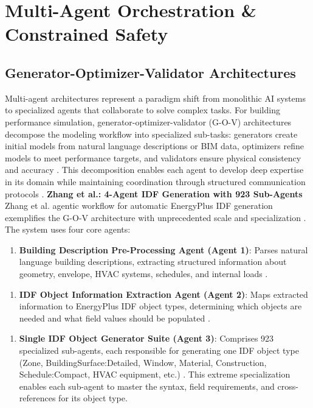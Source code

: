 \documentclass[12pt,a4paper]{article}
\begin{document}
\section{Multi-Agent Orchestration \& Constrained Safety}
\subsection{Generator-Optimizer-Validator Architectures}
Multi-agent architectures represent a paradigm shift from monolithic AI systems to specialized agents that collaborate to solve complex tasks. For building performance simulation, generator-optimizer-validator (G-O-V) architectures decompose the modeling workflow into specialized sub-tasks: generators create initial models from natural language descriptions or BIM data, optimizers refine models to meet performance targets, and validators ensure physical consistency and accuracy \cite{ref123}. This decomposition enables each agent to develop deep expertise in its domain while maintaining coordination through structured communication protocols \cite{ref125}.
\textbf{Zhang et al.: 4-Agent IDF Generation with 923 Sub-Agents}
Zhang et al. agentic workflow for automatic EnergyPlus IDF generation exemplifies the G-O-V architecture with unprecedented scale and specialization \cite{ref123}. The system uses four core agents:
\begin{enumerate}
  \item \textbf{Building Description Pre-Processing Agent (Agent 1)}: Parses natural language building descriptions, extracting structured information about geometry, envelope, HVAC systems, schedules, and internal loads \cite{ref123}.
\end{enumerate}
\begin{enumerate}[resume]
  \item \textbf{IDF Object Information Extraction Agent (Agent 2)}: Maps extracted information to EnergyPlus IDF object types, determining which objects are needed and what field values should be populated \cite{ref123}.
\end{enumerate}
\begin{enumerate}[resume]
  \item \textbf{Single IDF Object Generator Suite (Agent 3)}: Comprises 923 specialized sub-agents, each responsible for generating one IDF object type (Zone, BuildingSurface:Detailed, Window, Material, Construction, Schedule:Compact, HVAC equipment, etc.) \cite{ref123}. This extreme specialization enables each sub-agent to master the syntax, field requirements, and cross-references for its object type.
\end{enumerate}
\end{document}
